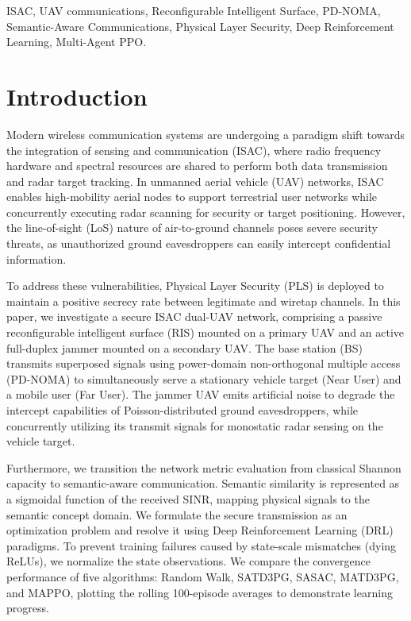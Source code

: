 \documentclass[journal,onecolumn]{IEEEtran}
\begin{document}
\begin{IEEEkeywords}
ISAC, UAV communications, Reconfigurable Intelligent Surface, PD-NOMA, Semantic-Aware Communications, Physical Layer Security, Deep Reinforcement Learning, Multi-Agent PPO.
\end{IEEEkeywords}

\IEEEpeerreviewmaketitle

\section{Introduction}
Modern wireless communication systems are undergoing a paradigm shift towards the integration of sensing and communication (ISAC), where radio frequency hardware and spectral resources are shared to perform both data transmission and radar target tracking. In unmanned aerial vehicle (UAV) networks, ISAC enables high-mobility aerial nodes to support terrestrial user networks while concurrently executing radar scanning for security or target positioning. However, the line-of-sight (LoS) nature of air-to-ground channels poses severe security threats, as unauthorized ground eavesdroppers can easily intercept confidential information.

To address these vulnerabilities, Physical Layer Security (PLS) is deployed to maintain a positive secrecy rate between legitimate and wiretap channels. In this paper, we investigate a secure ISAC dual-UAV network, comprising a passive reconfigurable intelligent surface (RIS) mounted on a primary UAV and an active full-duplex jammer mounted on a secondary UAV. The base station (BS) transmits superposed signals using power-domain non-orthogonal multiple access (PD-NOMA) to simultaneously serve a stationary vehicle target (Near User) and a mobile user (Far User). The jammer UAV emits artificial noise to degrade the intercept capabilities of Poisson-distributed ground eavesdroppers, while concurrently utilizing its transmit signals for monostatic radar sensing on the vehicle target.

Furthermore, we transition the network metric evaluation from classical Shannon capacity to semantic-aware communication. Semantic similarity is represented as a sigmoidal function of the received SINR, mapping physical signals to the semantic concept domain. We formulate the secure transmission as an optimization problem and resolve it using Deep Reinforcement Learning (DRL) paradigms. To prevent training failures caused by state-scale mismatches (dying ReLUs), we normalize the state observations. We compare the convergence performance of five algorithms: Random Walk, SATD3PG, SASAC, MATD3PG, and MAPPO, plotting the rolling 100-episode averages to demonstrate learning progress.
\end{document}
